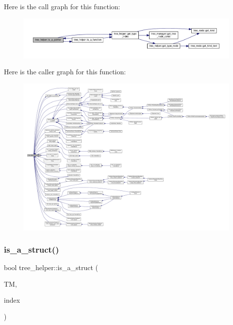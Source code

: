 Here is the call graph for this function\+:
\nopagebreak
\begin{figure}[H]
\begin{center}
\leavevmode
\includegraphics[width=350pt]{d7/d99/classtree__helper_a45e95e6b9cc351e7ecbd7837c0388e0a_cgraph}
\end{center}
\end{figure}
Here is the caller graph for this function\+:
\nopagebreak
\begin{figure}[H]
\begin{center}
\leavevmode
\includegraphics[width=350pt]{d7/d99/classtree__helper_a45e95e6b9cc351e7ecbd7837c0388e0a_icgraph}
\end{center}
\end{figure}
\mbox{\label{classtree__helper_a6035a0cd06adda67cd4e0ff655f30527}} 
\subsubsection{\texorpdfstring{is\+\_\+a\+\_\+struct()}{is\_a\_struct()}}
{\footnotesize\ttfamily bool tree\+\_\+helper\+::is\+\_\+a\+\_\+struct (\begin{DoxyParamCaption}\item[{const \hyperlink{tree__manager_8hpp_a792e3f1f892d7d997a8d8a4a12e39346}{tree\+\_\+manager\+Const\+Ref} \&}]{TM,  }\item[{const unsigned int}]{index }\end{DoxyParamCaption})\hspace{0.3cm}{\ttfamily [static]}}



